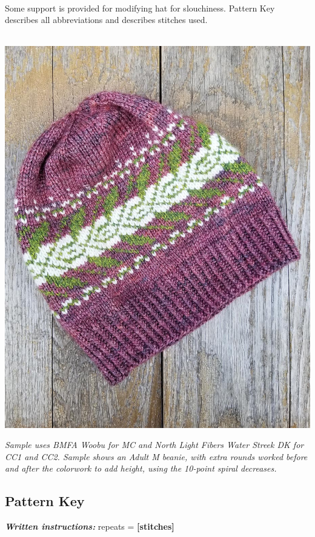 \documentclass[12pt]{article}
\newcommand{\vocab}[1]{\emph{\textbf{#1}}} %
\renewcommand{\repeat}[1]{\textbf{[#1]}} %
\begin{document}
\begin{multicols}{2}
~\\
Some support is provided for modifying hat for slouchiness.
Pattern Key describes all abbreviations and describes stitches used.

~\\
\vfill \raggedleft
\includegraphics[width=0.7\linewidth]{laidFlat.jpg}

\begin{addmargin}[0.3\linewidth]{0em}
\raggedleft\emph{\ssmall Sample uses BMFA Woobu for MC and North Light Fibers Water Streek DK for CC1 and CC2. Sample shows an Adult M beanie, with extra rounds worked before and after the colorwork to add height, using the 10-point spiral decreases.}
\end{addmargin}
\newpage \raggedright
\subsection*{Pattern Key}

\vocab{Written instructions:} repeats = \repeat{stitches}


\end{multicols}
\end{document}

